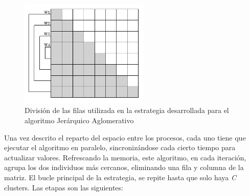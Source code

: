 		\begin{figure}[!h]
			\centering
			\includegraphics[width=0.55\textwidth]{images/chapter_3/aglomerativo_mpi}
			
			
			\caption{División de las filas utilizada en la estrategia desarrollada para el algoritmo Jerárquico Aglomerativo}
			\label{fig:aglomerativo}
		\end{figure}
		
		
		
		Una vez descrito el reparto del espacio entre los procesos, cada uno tiene que ejecutar el algoritmo en paralelo, sincronizándose cada cierto tiempo para actualizar valores. Refrescando la memoria, este algoritmo, en cada iteración, agrupa los dos individuos más cercanos, eliminando una fila y columna de la matriz. El bucle principal de la estrategia, se repite hasta que solo haya \textit{C} clusters. Las etapas son las siguientes:
		
